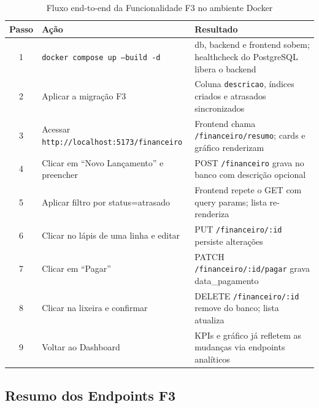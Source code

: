 \documentclass[12pt, a4paper]{article}
\newcommand{\thead}[1]{\cellcolor{tableheader}\color{white}\bfseries #1}
\newcommand{\talt}{\rowcolor{tablerowalt}}
\begin{document}
\begin{table}[H]
\centering
\begin{tabularx}{\textwidth}{|c|l|X|}
\hline
\thead{Passo} & \thead{Ação} & \thead{Resultado} \\
\hline
1 & \texttt{docker compose up --build -d}                  & db, backend e frontend sobem; healthcheck do PostgreSQL libera o backend \\
\talt 2 & Aplicar a migração F3                                  & Coluna \texttt{descricao}, índices criados e atrasados sincronizados \\
3 & Acessar \texttt{http://localhost:5173/financeiro}      & Frontend chama \texttt{/financeiro/resumo}; cards e gráfico renderizam \\
\talt 4 & Clicar em ``Novo Lançamento'' e preencher              & POST \texttt{/financeiro} grava no banco com descrição opcional \\
5 & Aplicar filtro por status=atrasado                     & Frontend repete o GET com query params; lista re-renderiza \\
\talt 6 & Clicar no lápis de uma linha e editar                  & PUT \texttt{/financeiro/:id} persiste alterações \\
7 & Clicar em ``Pagar''                                    & PATCH \texttt{/financeiro/:id/pagar} grava data\_pagamento \\
\talt 8 & Clicar na lixeira e confirmar                          & DELETE \texttt{/financeiro/:id} remove do banco; lista atualiza \\
9 & Voltar ao Dashboard                                    & KPIs e gráfico já refletem as mudanças via endpoints analíticos \\
\hline
\end{tabularx}
\caption{Fluxo end-to-end da Funcionalidade F3 no ambiente Docker}
\end{table}

\subsection{Resumo dos Endpoints F3}
\end{document}
